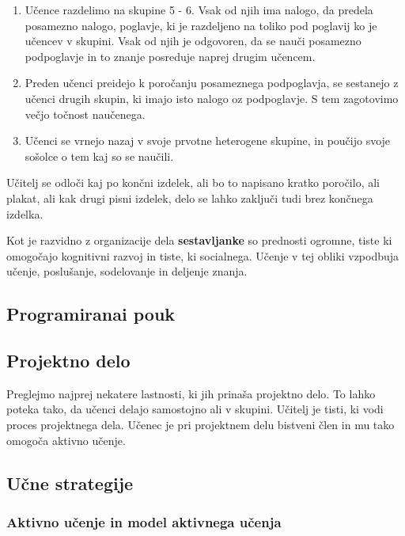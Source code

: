 \begin{description}
  \begin{enumerate}
  \item Učence razdelimo na skupine 5 - 6. Vsak od njih ima nalogo, da
    predela posamezno nalogo, poglavje, ki je razdeljeno na toliko pod
    poglavij ko je učencev v skupini. Vsak od njih je odgovoren, da se
    nauči posamezno podpoglavje in to znanje posreduje naprej drugim
    učencem.
  \item Preden učenci preidejo k poročanju posameznega podpoglavja, se
    sestanejo z učenci drugih skupin, ki imajo isto nalogo oz
    podpoglavje. S tem zagotovimo večjo točnost naučenega.
  \item Učenci se vrnejo nazaj v svoje prvotne heterogene skupine, in
    poučijo svoje sošolce o tem kaj so se naučili.
  \end{enumerate}
  Učitelj se odloči kaj po končni izdelek, ali bo to napisano kratko
  poročilo, ali plakat, ali kak drugi pisni izdelek, delo se lahko
  zaključi tudi brez končnega izdelka.

  Kot je razvidno z organizacije dela \textbf{sestavljanke} so
  prednosti ogromne, tiste ki omogočajo kognitivni razvoj in tiste, ki
  socialnega. Učenje v tej obliki vzpodbuja učenje, poslušanje,
  sodelovanje in deljenje znanja.
\end{description}

\subsection{Programiranai pouk}
\label{programirani_pouk
}



\subsection{Projektno delo}
\label{sec:projektno_delo}

Preglejmo najprej nekatere lastnosti, ki jih prinaša projektno
delo. To lahko poteka tako, da učenci delajo samostojno ali v
skupini. Učitelj je tisti, ki vodi proces projektnega dela. Učenec je
pri projektnem delu bistveni člen in mu tako omogoča aktivno učenje.

\subsection{Učne strategije}
\label{sec:učne_strategije}

\subsubsection{Aktivno učenje in model aktivnega učenja}
\label{sec:aktivno_učenje_in_model_aktivnega_učenja}

